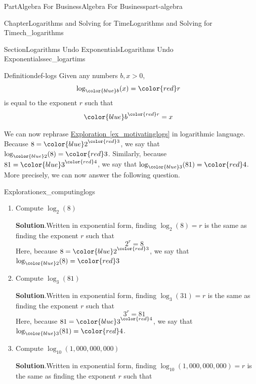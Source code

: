 \documentclass{tufte-book}
\newcommand{\blocktitlefont}{\relax}
\newcommand{\xreffont}{\relax}
\numberwithin{equation}{chapter}
\begin{document}
\begin{partptx}{Part}{Algebra For Business}{}{Algebra For Business}{}{}{part-algebra}
\begin{chapterptx}{Chapter}{Logarithms and Solving for Time}{}{Logarithms and Solving for Time}{}{}{ch_logarithms}
\begin{sectionptx}{Section}{Logarithms Undo Exponentials}{}{Logarithms Undo Exponentials}{}{}{sec_logartims}
\begin{definition}{Definition}{}{def-logs}%
Given any numbers \(b,x>0\),%
\begin{equation*}
\log_{\color{blue}b}(x) = {\color{red} r}
\end{equation*}
is equal to the exponent \(r\) such that%
\begin{equation*}
{\color{blue}b}^{\color{red} r} = x
\end{equation*}
%
\end{definition}
We can now rephrase \hyperref[ex_motivatinglogs]{Exploration~{\xreffont\ref{ex_motivatinglogs}}} in logarithmic language. Because \(8 = {\color{blue}2}^{\color{red}3}\), we say that \(\log_{\color{blue} 2}(8) = {\color{red}3}\). Similarly, because \(81 = {\color{blue}3}^{\color{red}4}\), we say that \(\log_{\color{blue} 3} (81) = {\color{red}4}\). More precisely, we can now answer the following question.%
\begin{exploration}{Exploration}{}{ex_computinglogs}%
\begin{enumerate}[font=\bfseries,label=(\alph*),ref=\alph*]%
\item{}Compute \(\log_2(8)\)%
\par\smallskip%
\noindent\textbf{\blocktitlefont Solution}.\hypertarget{ex_computinglogs-1-2}{}\quad{}Written in exponential form, finding \(\log_2(8) = r\) is the same as finding the exponent \(r\) such that%
\begin{equation*}
2^r = 8
\end{equation*}
Here, because \(8 = {\color{blue}2}^{\color{red}3}\), we say that \(\log_{\color{blue} 2}(8) = {\color{red}3}\)%
\item{}Compute \(\log_3(81)\)%
\par\smallskip%
\noindent\textbf{\blocktitlefont Solution}.\hypertarget{ex_computinglogs-2-2}{}\quad{}Written in exponential form, finding \(\log_3(31) = r\) is the same as finding the exponent \(r\) such that%
\begin{equation*}
3^r = 81
\end{equation*}
Here, because \(81 = {\color{blue}3}^{\color{red}4}\), we say that \(\log_{\color{blue} 3} (81) = {\color{red}4}\).%
\item{}Compute \(\log_{10}(1,000,000,000)\)%
\par\smallskip%
\noindent\textbf{\blocktitlefont Solution}.\hypertarget{ex_computinglogs-3-2}{}\quad{}Written in exponential form, finding \(\log_10(1,000,000,000) = r\) is the same as finding the exponent \(r\) such that%
\begin{equation*}

\end{equation*}
\end{enumerate}
\end{exploration}
\end{sectionptx}
\end{chapterptx}
\end{partptx}
\end{document}
